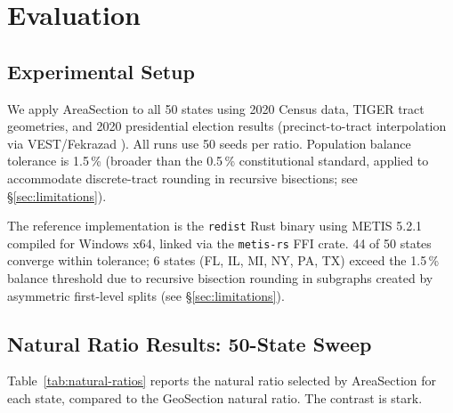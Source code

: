 \section{Evaluation}
\label{sec:evaluation}

\subsection{Experimental Setup}

We apply AreaSection to all 50 states using 2020 Census data, TIGER
tract geometries, and 2020 presidential election results (precinct-to-tract
interpolation via VEST/Fekrazad \citep{fekrazad2021}).
All runs use 50 seeds per ratio.
Population balance tolerance is 1.5\,\% (broader than the 0.5\,\%
constitutional standard, applied to accommodate discrete-tract rounding in
recursive bisections; see \S\ref{sec:limitations}).

The reference implementation is the \texttt{redist} Rust binary using METIS 5.2.1
compiled for Windows x64, linked via the \texttt{metis-rs} FFI crate.
44 of 50 states converge within tolerance; 6 states (FL, IL, MI, NY, PA, TX)
exceed the 1.5\,\% balance threshold due to recursive bisection rounding in
subgraphs created by asymmetric first-level splits (see \S\ref{sec:limitations}).

\subsection{Natural Ratio Results: 50-State Sweep}

Table~\ref{tab:natural-ratios} reports the natural ratio selected by AreaSection
for each state, compared to the GeoSection natural ratio.
The contrast is stark.

